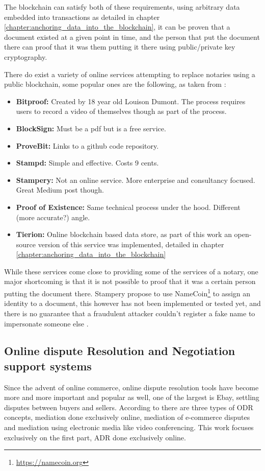 \documentclass[12pt,msc,a4paper,oneside]{ucl_thesis}
\begin{document}
The blockchain can satisfy both of these requirements, using arbitrary data embedded into transactions as detailed in chapter \ref{chapter:anchoring_data_into_the_blockchain}, it can be proven that a document existed at a given point in time, and the person that put the document there can proof that it was them putting it there using public/private key cryptography.

There do exist a variety of online services attempting to replace notaries using a public blockchain, some popular ones are the following, as taken from \cite{notary:does_blockchain_notary_work}:

\begin{itemize}
    \item{\textbf{Bitproof:}} Created by 18 year old Louison Dumont. The process requires users to record a video of themselves though as part of the process.
    \item{\textbf{BlockSign:}} Must be a pdf but is a free service.
    \item{\textbf{ProveBit:}} Links to a github code repository.
    \item{\textbf{Stampd:}} Simple and effective. Costs 9 cents.
    \item{\textbf{Stampery:}} Not an online service. More enterprise and consultancy focused. Great Medium post though.
    \item{\textbf{Proof of Existence:}} Same technical process under the hood. Different (more accurate?) angle.
    \item{\textbf{Tierion:}} Online blockchain based data store, as part of this work an open-source version of this service was implemented, detailed in chapter \ref{chapter:anchoring_data_into_the_blockchain}
\end{itemize}

While these services come close to providing some of the services of a notary, one major shortcoming is that it is not possible to proof that it was a certain person putting the document there. Stampery propose to use NameCoin\footnote{\url{https://namecoin.org}} to assign an identity to a document, this however has not been implemented or tested yet, and there is no guarantee that a fraudulent attacker couldn't register a fake name to impersonate someone else \cite{notary:does_blockchain_notary_work} \cite{notary:stampery_medium}.

\subsection{Online dispute Resolution and Negotiation support systems}
Since the advent of online commerce, online dispute resolution tools have become more and more important and popular as well, one of the largest is Ebay, settling disputes between buyers and sellers. \cite{deffains2005efficiency} According to \cite{Lodder:ORD_system_design} there are three types of ODR concepts, mediation done exclusively online, mediation of e-commerce disputes and mediation using electronic media like video conferencing. This work focuses exclusively on the first part, ADR done exclusively online.
\end{document}
